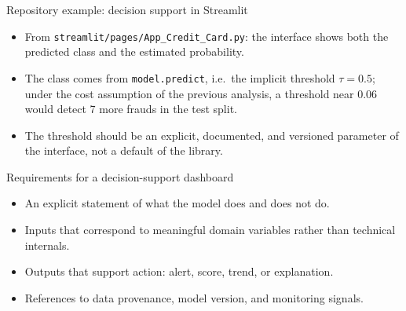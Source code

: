 \begin{frame}{Repository example: decision support in Streamlit}
\centering
{}
\vspace{0.6em}
\begin{itemize}\footnotesize
\item From \texttt{streamlit/pages/App\_Credit\_Card.py}: the interface shows both the predicted class and the estimated probability.
\item The class comes from \texttt{model.predict}, i.e.\ the implicit threshold $\tau = 0.5$; under the cost assumption of the previous analysis, a threshold near 0.06 would detect 7 more frauds in the test split.
\item The threshold should be an explicit, documented, and versioned parameter of the interface, not a default of the library.
\end{itemize}
\coursefooter
\end{frame}

\begin{frame}{Requirements for a decision-support dashboard}
\begin{itemize}
\item An explicit statement of what the model does and does not do.
\item Inputs that correspond to meaningful domain variables rather than technical internals.
\item Outputs that support action: alert, score, trend, or explanation.
\item References to data provenance, model version, and monitoring signals.
\end{itemize}
\coursefooter
\end{frame}

